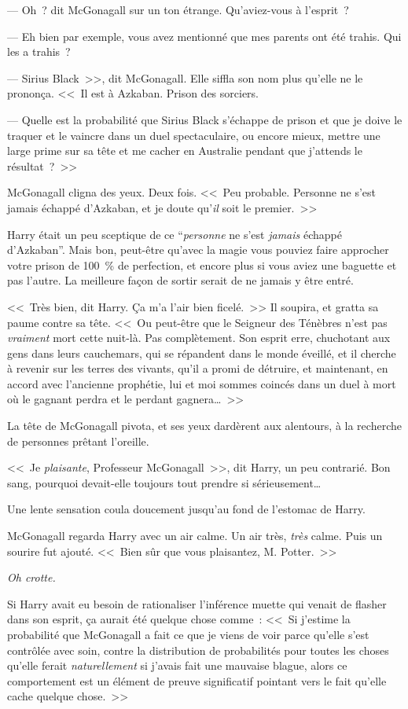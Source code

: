 --- Oh~? dit McGonagall sur un ton étrange. Qu'aviez-vous à l'esprit~?

--- Eh bien par exemple, vous avez mentionné que mes parents ont été trahis. Qui les a trahis~?

--- Sirius Black~>>, dit McGonagall. Elle siffla son nom plus qu'elle ne le prononça. <<~Il est à Azkaban. Prison des sorciers.

--- Quelle est la probabilité que Sirius Black s'échappe de prison et que je doive le traquer et le vaincre dans un duel spectaculaire, ou encore mieux, mettre une large prime sur sa tête et me cacher en Australie pendant que j'attends le résultat~?~>>

McGonagall cligna des yeux. Deux fois. <<~Peu probable. Personne ne s'est jamais échappé d'Azkaban, et je doute qu'\emph{il} soit le premier.~>>

Harry était un peu sceptique de ce “\emph{personne} ne s'est \emph{jamais} échappé d'Azkaban”. Mais bon, peut-être qu'avec la magie vous pouviez faire approcher votre prison de 100~\% de perfection, et encore plus si vous aviez une baguette et pas l'autre. La meilleure façon de sortir serait de ne jamais y être entré.

<<~Très bien, dit Harry. Ça m'a l'air bien ficelé.~>> Il soupira, et gratta sa paume contre sa tête. <<~Ou peut-être que le Seigneur des Ténèbres n'est pas \emph{vraiment} mort cette nuit-là. Pas complètement. Son esprit erre, chuchotant aux gens dans leurs cauchemars, qui se répandent dans le monde éveillé, et il cherche à revenir sur les terres des vivants, qu'il a promi de détruire, et maintenant, en accord avec l'ancienne prophétie, lui et moi sommes coincés dans un duel à mort où le gagnant perdra et le perdant gagnera…~>>

La tête de McGonagall pivota, et ses yeux dardèrent aux alentours, à la recherche de personnes prêtant l'oreille.

<<~Je \emph{plaisante}, Professeur McGonagall~>>, dit Harry, un peu contrarié. Bon sang, pourquoi devait-elle toujours tout prendre si sérieusement…

Une lente sensation coula doucement jusqu'au fond de l'estomac de Harry.

McGonagall regarda Harry avec un air calme. Un air très, \emph{très} calme. Puis un sourire fut ajouté. <<~Bien sûr que vous plaisantez, M. Potter.~>>

\emph{Oh crotte.}

Si Harry avait eu besoin de rationaliser l'inférence muette qui venait de flasher dans son esprit, ça aurait été quelque chose comme~: <<~Si j'estime la probabilité que McGonagall a fait ce que je viens de voir parce qu'elle s'est contrôlée avec soin, contre la distribution de probabilités pour toutes les choses qu'elle ferait \emph{naturellement} si j'avais fait une mauvaise blague, alors ce comportement est un élément de preuve significatif pointant vers le fait qu'elle cache quelque chose.~>>

